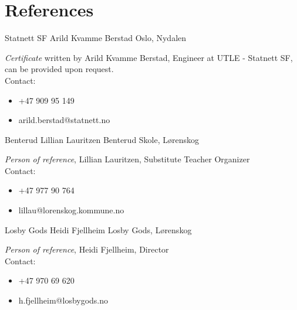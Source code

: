 \documentclass[]{friggeri-cv} %
\begin{document}

\section{References}
\begin{entrylist}


\entry
{Statnett SF}
{Arild Kvamme Berstad}
{Oslo, Nydalen}
{\emph{Certificate} written by Arild Kvamme Berstad, Engineer at UTLE - Statnett SF, can be provided upon request.
\\
Contact:
\begin{itemize}
\item +47 909 95 149
\item arild.berstad@statnett.no
\end{itemize}
}



\entry
{Benterud}
{Lillian Lauritzen}
{Benterud Skole, Lørenskog}
{\emph{Person of reference}, Lillian Lauritzen, Substitute Teacher Organizer
\\
Contact:
\begin{itemize}
\item +47 977 90 764
\item lillau@lorenskog.kommune.no
\end{itemize}
}


\entry
{Losby Gods}
{Heidi Fjellheim}
{Losby Gods, Lørenskog}
{\emph{Person of reference}, Heidi Fjellheim, Director
\\
Contact:
\begin{itemize}
\item +47 970 69 620
\item h.fjellheim@losbygods.no
\end{itemize}
}

\end{entrylist}

\end{document}
